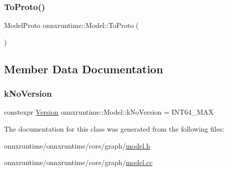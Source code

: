 \mbox{\label{classonnxruntime_1_1Model_a6548029afd30cb62977066de5f70cb90}} 
\subsubsection{\texorpdfstring{To\+Proto()}{ToProto()}}
{\footnotesize\ttfamily Model\+Proto onnxruntime\+::\+Model\+::\+To\+Proto (\begin{DoxyParamCaption}{ }\end{DoxyParamCaption})}



\subsection{Member Data Documentation}
\mbox{\label{classonnxruntime_1_1Model_a092dabe5ac2981fde3b0ad0875f1c0c3}} 
\subsubsection{\texorpdfstring{k\+No\+Version}{kNoVersion}}
{\footnotesize\ttfamily constexpr \mbox{\hyperlink{namespaceonnxruntime_ab7fae8d5830807c074def3bb8ae23cf1}{Version}} onnxruntime\+::\+Model\+::k\+No\+Version = I\+N\+T64\+\_\+\+M\+AX\hspace{0.3cm}{\ttfamily [static]}}



The documentation for this class was generated from the following files\+:\begin{DoxyCompactItemize}
\item 
onnxruntime/onnxruntime/core/graph/\mbox{\hyperlink{model_8h}{model.\+h}}\item 
onnxruntime/onnxruntime/core/graph/\mbox{\hyperlink{model_8cc}{model.\+cc}}\end{DoxyCompactItemize}
